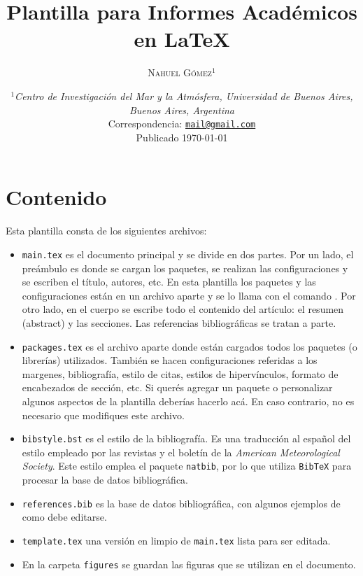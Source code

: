 \documentclass[a4paper,10pt,twocolumn,twoside]{article}
\title{
    \fontsize{14pt}{16pt}\selectfont
    \textbf{
        Plantilla para Informes 
        Académicos en \LaTeX
    }
}
\author{
\fontsize{10pt}{8pt}\selectfont
    \textsc{
        Nahuel Gómez$^1$
    }
}
\date{
\fontsize{9pt}{9pt}\selectfont
\textit{
$^1$Centro de Investigación del Mar y la Atmósfera, Universidad de Buenos Aires, Buenos Aires, Argentina\\[2ex]
}
Correspondencia: \href{mailto:mail@gmail.com}{\texttt{mail@gmail.com}} \\ [1ex]
Publicado \today
}
\begin{document}

\section{Contenido}

Esta plantilla consta de los siguientes archivos:
\begin{itemize}
    \item \texttt{main.tex} es el documento principal y se divide en dos partes. Por un lado, el preámbulo es donde se cargan los paquetes, se realizan las configuraciones y se escriben el título, autores, etc. En esta plantilla los paquetes y las configuraciones están en un archivo aparte y se lo llama con el comando \verb++. Por otro lado, en el cuerpo se escribe todo el contenido del artículo: el resumen (abstract) y las secciones. Las referencias bibliográficas se tratan a parte.
    \item \texttt{packages.tex} es el archivo aparte donde están cargados todos los paquetes (o librerías) utilizados. También se hacen configuraciones referidas a los margenes, bibliografía, estilo de citas, estilos de hipervínculos, formato de encabezados de sección, etc. Si querés agregar un paquete o personalizar algunos aspectos de la plantilla deberías hacerlo acá. En caso contrario, no es necesario que modifiques este archivo.
    \item \texttt{bibstyle.bst} es el estilo de la bibliografía. Es una traducción al español del estilo empleado por las revistas y el boletín de la \emph{American Meteorological Society}. Este estilo emplea el paquete \texttt{natbib}, por lo que utiliza \texttt{BibTeX} para procesar la base de datos bibliográfica.
    \item \texttt{references.bib} es la base de datos bibliográfica, con algunos ejemplos de como debe editarse.
    \item \texttt{template.tex} una versión en limpio de \texttt{main.tex} lista para ser editada.
    \item En la carpeta \texttt{figures} se guardan las figuras que se utilizan en el documento.
\end{itemize}
\end{document}
